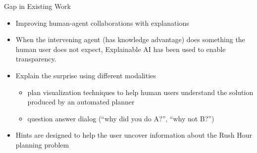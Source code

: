 \begin{frame}{Gap in Existing Work}
\begin{itemize}
\item Improving human-agent collaborations with explanations
\item When the intervening agent (has knowledge advantage) does something the human user does not expect, Explainable AI has been used to enable transparency.
\item Explain the surprise using different modalities
\begin{itemize}
\item plan visualization techniques to help human users understand the solution produced by an automated planner
\item question answer dialog (``why did you do A?'', ``why not B?'')
\end{itemize}
\item Hints are designed to help the user uncover information about the Rush Hour planning problem
\end{itemize}
\end{frame}